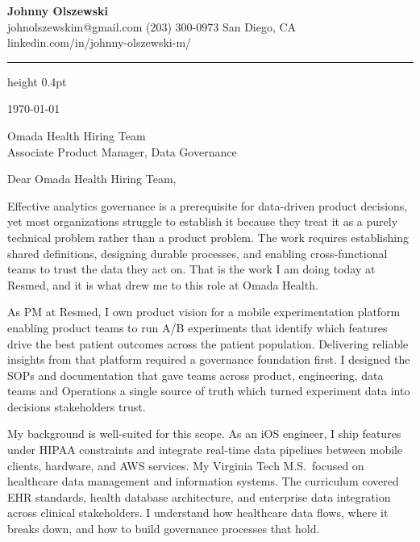 \documentclass[11pt,letterpaper]{article}
\begin{document}
\begin{center}
  {\Large\textbf{Johnny Olszewski}}\\[0.3em]
  {\small johnolszewskim@gmail.com \textbar{} (203) 300-0973 \textbar{} San Diego, CA \textbar{} linkedin.com/in/johnny-olszewski-m/}
\end{center}

\vspace{0.5em}
\hrule height 0.4pt
\vspace{1em}

\today

\vspace{0.5em}

Omada Health Hiring Team\\
Associate Product Manager, Data Governance

\vspace{0.5em}

Dear Omada Health Hiring Team,

Effective analytics governance is a prerequisite for data-driven product decisions, yet most organizations struggle to establish it because they treat it as a purely technical problem rather than a product problem. The work requires establishing shared definitions, designing durable processes, and enabling cross-functional teams to trust the data they act on. That is the work I am doing today at Resmed, and it is what drew me to this role at Omada Health.

As PM at Resmed, I own product vision for a mobile experimentation platform enabling product teams to run A/B experiments that identify which features drive the best patient outcomes across the patient population. Delivering reliable insights from that platform required a governance foundation first. I designed the SOPs and documentation that gave teams across product, engineering, data teams and Operations a single source of truth which turned experiment data into decisions stakeholders trust.

My background is well-suited for this scope. As an iOS engineer, I ship features under HIPAA constraints and integrate real-time data pipelines between mobile clients, hardware, and AWS services. My Virginia Tech M.S.\ focused on healthcare data management and information systems. The curriculum covered EHR standards, health database architecture, and enterprise data integration across clinical stakeholders. I understand how healthcare data flows, where it breaks down, and how to build governance processes that hold.
\end{document}
